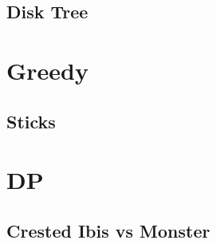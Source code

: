        \subsection{Disk Tree}        
                
%                 
%                 

\section{Greedy}
        \subsection{Sticks}
                

\section{DP}
        \subsection{Crested Ibis vs Monster}
                
